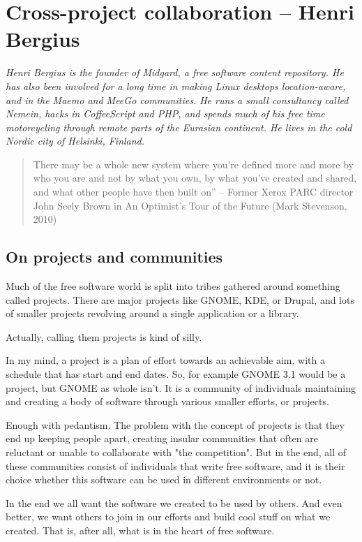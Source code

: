 \chapter{Cross-project collaboration -- Henri Bergius}

\textit{Henri Bergius is the founder of Midgard, a free software content repository. He has also been involved for a long time in making Linux desktops location-aware, and in the Maemo and MeeGo communities. He runs a small consultancy called Nemein, hacks in CoffeeScript and PHP, and spends much of his free time motorcycling through remote parts of the Eurasian continent. He lives in the cold Nordic city of Helsinki, Finland.}

\begin{quote}
There may be a whole new system where you're defined more and more by who you are and not by what you own, by what you've created and shared, and what other people have then built on” -- Former Xerox PARC director John Seely Brown in An Optimist's Tour of the Future (Mark Stevenson, 2010)
\end{quote}

\section*{On projects and communities}

Much of the free software world is split into tribes gathered around something called projects. There are major projects like GNOME, KDE, or Drupal, and lots of smaller projects revolving around a single application or a library.

Actually, calling them projects is kind of silly.

In my mind, a project is a plan of effort towards an achievable aim, with a schedule that has start and end dates. So, for example GNOME 3.1 would be a project, but GNOME as whole isn't. It is a community of individuals maintaining and creating a body of software through various smaller efforts, or projects.

Enough with pedantism. The problem with the concept of projects is that they end up keeping people apart, creating insular communities that often are reluctant or unable to collaborate with "the competition". But in the end, all of these communities consist of individuals that write free software, and it is their choice whether this software can be used in different environments or not.

In the end we all want the software we created to be used by others. And even better, we want others to join in our efforts and build cool stuff on what we created. That is, after all, what is in the heart of free software.

